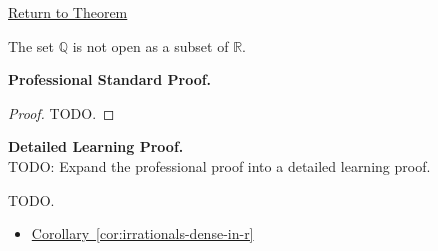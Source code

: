 \newpage
{}
\label{prf:q-not-open-in-r}

\begin{remark*}[Return]
\hyperref[cor:q-not-open-in-r]{Return to Theorem}
\end{remark*}

\begin{theorem*}
The set $\mathbb{Q}$ is not open as a subset of $\mathbb{R}$.
\end{theorem*}

\textbf{Professional Standard Proof.}~\\
\begin{proof}
TODO.
\end{proof}

\textbf{Detailed Learning Proof.}~\\
TODO: Expand the professional proof into a detailed learning proof.


\begin{remark*}
TODO.
\end{remark*}

\begin{dependencies}
\begin{itemize}
  \item \hyperref[cor:irrationals-dense-in-r]{Corollary~\ref*{cor:irrationals-dense-in-r}}
\end{itemize}
\end{dependencies}


